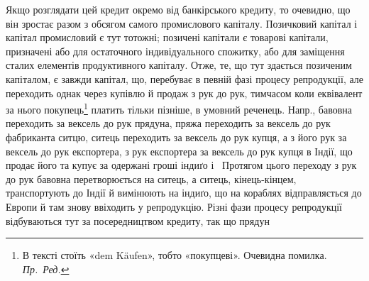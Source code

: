 Якщо розглядати цей кредит окремо від банкірського кредиту, то очевидно,
що він зростає разом з обсягом самого промислового капіталу. Позичковий капітал
і капітал промисловий є тут тотожні; позичені капітали є товарові капітали,
призначені або для остаточного індивідуального спожитку, або для заміщення
сталих елементів продуктивного капіталу. Отже, те, що тут здається
позиченим капіталом, є завжди капітал, що, перебуває в певній фазі процесу репродукції,
але переходить однак через купівлю й продаж з рук до рук, тимчасом
коли еквівалент за нього покупець\footnote*{
В тексті стоїть «dem Käufen», тобто «покупцеві». Очевидна помилка. \emph{Пр.~Ред.}
} платить тільки пізніше, в умовний реченець.
Напр., бавовна переходить за вексель до рук прядуна, пряжа переходить за
вексель до рук фабриканта ситцю, ситець переходить за вексель до рук купця,
а з його рук за вексель до рук експортера, з рук експортера за вексель до рук
купця в Індії, що продає його та купує за одержані гроші індиґо і~ Протягом
цього переходу з рук до рук бавовна перетворюється на ситець, а ситець,
кінець-кінцем, транспортують до Індії й вимінюють на індиґо, що на кораблях
відправляється до Европи й там знову ввіходить у репродукцію. Різні фази процесу
репродукції відбуваються тут за посередництвом кредиту, так що прядун
\parbreak{}  %
